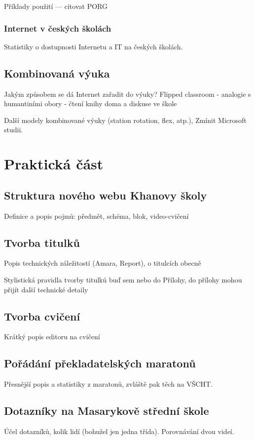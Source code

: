 \documentclass[a4paper, 12pt]{article}
\begin{document}
Příklady použití --- citovat PORG

\subsubsection{Internet v českých školách}
Statistiky o dostupnosti Internetu a IT na českých školách.


\subsection{Kombinovaná výuka}
Jakým způsobem se dá Internet zařadit do výuky?
Flipped classroom - analogie s humantiními obory - čtení knihy doma a diskuse ve škole

Další modely kombinované výuky (station rotation, flex, atp.), Zmínit Microsoft studii.

\newpage

\section{Praktická část}

\subsection{Struktura nového webu Khanovy školy}
Definice a popis pojmů: předmět, schéma, blok, video-cvičení

\subsection{Tvorba titulků}
Popis technických záležitostí (Amara, Report), o titulcích obecně

Stylistická pravidla tvorby titulků buď sem nebo do Přílohy, do přílohy mohou přijít další technické detaily

\subsection{Tvorba cvičení}
Krátký popis editoru na cvičení

\subsection{Pořádání překladatelských maratonů}
Přesnější popis a statistiky z maratonů, zvláště pak těch na VŠCHT.

\subsection{Dotazníky na Masarykově střední škole}
Účel dotazníků, kolik lidí (bohužel jen jedna třída). Porovnávání dvou videí.
\end{document}

